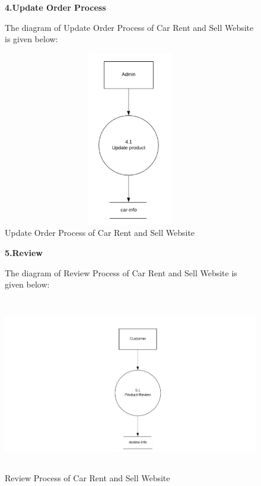\noindent 
\begin{figure}


 \textbf{4.Update Order Process}


\noindent 

\noindent 

\noindent 

\noindent The diagram of Update Order Process of Car Rent and Sell Website is given below:

\noindent 

\noindent \includegraphics*[width=5.50in, height=3in, keepaspectratio=false]{figures/Update}

\caption{Update Order Process of Car Rent and Sell Website}
\end{figure}
\noindent 

\noindent 
\begin{figure}

 \textbf{5.Review}


\noindent 

\noindent The diagram of Review Process of Car Rent and Sell Website is given below:

\noindent \includegraphics*[width=5.50in, height=3in, keepaspectratio=false]{figures/Review}

\caption{ Review Process of Car Rent and Sell Website}
\end{figure}
\noindent 

